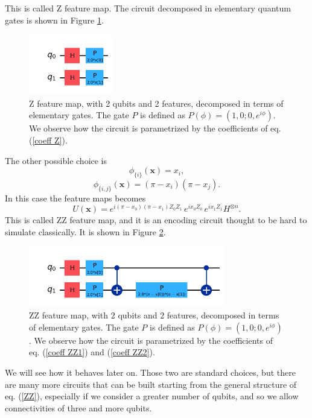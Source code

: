 \documentclass[a4paper]{article}
\begin{document}
\begin{itemize}
    This is called Z feature map. The circuit decomposed in elementary quantum gates is shown in Figure \ref{fig:Z}. 
    \begin{figure}[h!]
        \centering
        \includegraphics[height=100px]{images/Z.png}
        \caption{Z feature map, with 2 qubits and 2 features, decomposed in terms of elementary gates. The gate $P$ is defined as $P(\phi) = (1,0; 0, e^{i\phi})$. We observe how the circuit is parametrized by the coefficients of eq. (\ref{coeff Z}).}
        \label{fig:Z}
    \end{figure}
    The other possible choice is  
    \begin{equation}
        \phi_{\{i\}}(\mathbf{x})=x_i,
        \label{coeff ZZ1}
    \end{equation}
    \begin{equation}
        \phi_{\{i,j\}}(\mathbf{x})=(\pi-x_i)(\pi-x_j).
        \label{coeff ZZ2}
    \end{equation}
    In this case the feature maps becomes 
    \begin{equation}
        {U}(\mathbf{x})=e^{i(\pi-x_0)(\pi-x_1)Z_0Z_1}\,e^{ix_0Z_0}\,e^{ix_1Z_1}H^{\otimes n}.
    \end{equation}
    This is called ZZ feature map, and it is an encoding circuit thought to be hard to simulate classically. It is shown in Figure \ref{fig:ZZ}. 
    \begin{figure}[h!]
        \centering
        \includegraphics[height=100px]{images/ZZ.png}
        \caption{ZZ feature map, with 2 qubits and 2 features, decomposed in terms of elementary gates. The gate $P$ is defined as $P(\phi) = (1,0; 0, e^{i\phi})$. We observe how the circuit is parametrized by the coefficients of eq. (\ref{coeff ZZ1}) and (\ref{coeff ZZ2}).}
        \label{fig:ZZ}
    \end{figure}
    We will see how it behaves later on. Those two are standard choices, but there are many more circuits that can be built starting from the general structure of eq. (\ref{ZZ}), especially if we consider a greater number of qubits, and so we allow connectivities of three and more qubits. 

\end{itemize}
\end{document}
